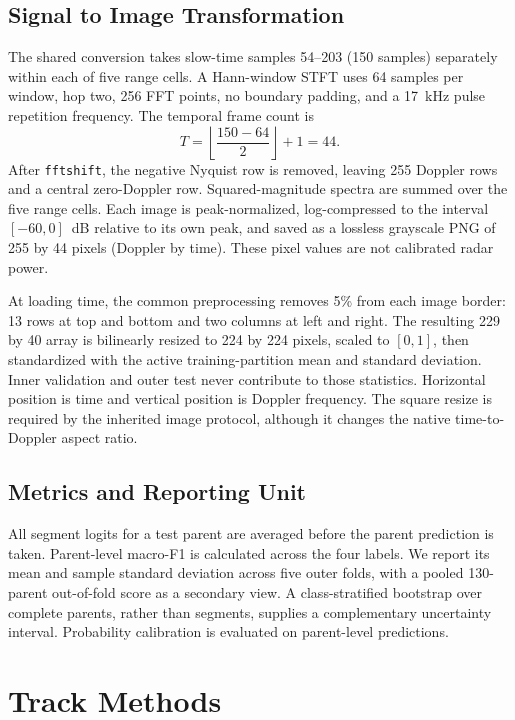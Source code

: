 \IfFileExists{IEEEtran.cls}{\ieeetrue\documentclass[conference]{IEEEtran}}{\ieeefalse\documentclass[10pt,twocolumn,letterpaper]{article}}
\begin{document}
\subsection{Signal to Image Transformation}
The shared conversion takes slow-time samples 54--203 (150 samples) separately within each of five range cells. A Hann-window STFT uses 64 samples per window, hop two, 256 FFT points, no boundary padding, and a 17~kHz pulse repetition frequency. The temporal frame count is
\begin{equation}
T=\left\lfloor\frac{150-64}{2}\right\rfloor+1=44.
\end{equation}
After \texttt{fftshift}, the negative Nyquist row is removed, leaving 255 Doppler rows and a central zero-Doppler row. Squared-magnitude spectra are summed over the five range cells. Each image is peak-normalized, log-compressed to the interval $[-60,0]$~dB relative to its own peak, and saved as a lossless grayscale PNG of 255 by 44 pixels (Doppler by time). These pixel values are not calibrated radar power.

At loading time, the common preprocessing removes 5\% from each image border: 13 rows at top and bottom and two columns at left and right. The resulting 229 by 40 array is bilinearly resized to 224 by 224 pixels, scaled to $[0,1]$, then standardized with the active training-partition mean and standard deviation. Inner validation and outer test never contribute to those statistics. Horizontal position is time and vertical position is Doppler frequency. The square resize is required by the inherited image protocol, although it changes the native time-to-Doppler aspect ratio.

\subsection{Metrics and Reporting Unit}
All segment logits for a test parent are averaged before the parent prediction is taken. Parent-level macro-F1 is calculated across the four labels. We report its mean and sample standard deviation across five outer folds, with a pooled 130-parent out-of-fold score as a secondary view. A class-stratified bootstrap over complete parents, rather than segments, supplies a complementary uncertainty interval. Probability calibration is evaluated on parent-level predictions.

\section{Track Methods}
\end{document}
